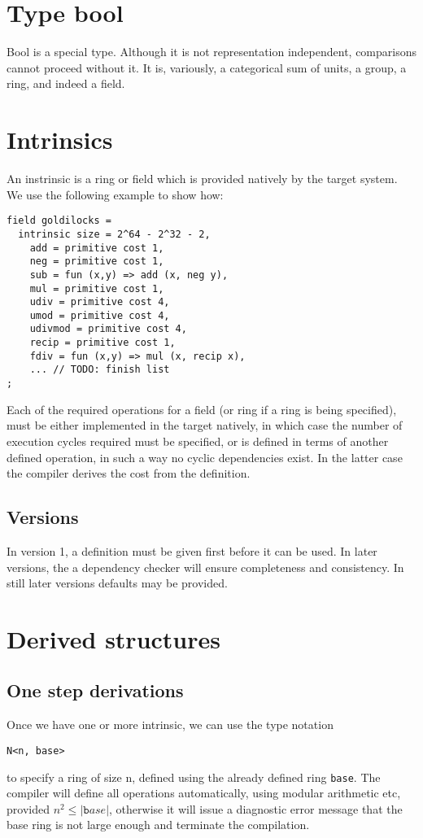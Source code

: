 \section{Type bool}
Bool is a special type. Although it is not representation independent,
comparisons cannot proceed without it. It is, variously, a categorical
sum of units, a group, a ring, and indeed a field.



\section{Intrinsics}
An instrinsic is a ring or field which is provided natively by the target system.
We use the following example to show how:
\begin{verbatim}
field goldilocks = 
  intrinsic size = 2^64 - 2^32 - 2, 
    add = primitive cost 1,
    neg = primitive cost 1,
    sub = fun (x,y) => add (x, neg y),
    mul = primitive cost 1,
    udiv = primitive cost 4,
    umod = primitive cost 4,
    udivmod = primitive cost 4,
    recip = primitive cost 1,
    fdiv = fun (x,y) => mul (x, recip x),
    ... // TODO: finish list
;
\end{verbatim}
Each of the required operations for a field (or ring if a ring is being specified),
must be either implemented in the target natively, in which case the number of
execution cycles required must be specified, or is defined in terms of another
defined operation, in such a way no cyclic dependencies exist. In the latter case
the compiler derives the cost from the definition.

\subsection{Versions}
In version 1, a definition must be given first before it can be used.
In later versions, the a dependency checker will ensure completeness
and consistency. In still later versions defaults may be provided.

\section{Derived structures}
\subsection{One step derivations}
Once we have one or more intrinsic, we can use the type notation
\begin{verbatim}
N<n, base>
\end{verbatim}
to specify a ring of size n, defined using the already defined ring \verb$base$.
The compiler will define all operations automatically, using modular arithmetic
etc, provided $n^2\leq |{\mathtt base}|$, otherwise it will issue a diagnostic
error message that the base ring is not large enough and terminate the compilation.

